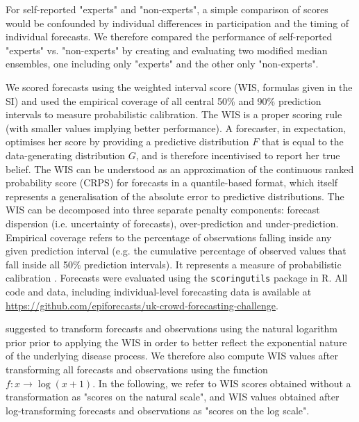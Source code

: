\documentclass[10pt,a4paper,twocolumn]{article}
\begin{document}
For self-reported "experts" and "non-experts", a simple comparison of scores would be confounded by individual differences in participation and the timing of individual forecasts. We therefore compared the performance of self-reported "experts" vs. "non-experts" by creating and evaluating two modified median ensembles, one including only "experts" and the other only "non-experts".


We scored forecasts using the weighted interval score (WIS, formulas given in the SI) %
\cite{bracherEvaluatingEpidemicForecasts2021} and used the empirical coverage of all central 50\% and 90\% prediction intervals to measure probabilistic calibration. The WIS is a proper scoring rule (with smaller values implying better performance). A forecaster, in expectation, optimises her score by providing a predictive distribution $F$ that is equal to the data-generating distribution $G$, and is therefore incentivised to report her true belief. The WIS can be understood as an approximation of the continuous ranked probability score (CRPS) for forecasts in a quantile-based format, which itself represents a generalisation of the absolute error to predictive distributions. The WIS can be decomposed into three separate penalty components: forecast dispersion (i.e. uncertainty of forecasts), over-prediction and under-prediction. Empirical coverage refers to the percentage of observations falling inside any given prediction interval (e.g. the cumulative percentage of observed values that fall inside all 50\% prediction intervals). It represents a measure of probabilistic calibration \citep{gneitingProbabilisticForecastsCalibration2007}. Forecasts were evaluated using the \texttt{scoringutils} \citep{bosseEvaluatingForecastsScoringutils2022} package in \textsf{R}. All code and data, including individual-level forecasting data is available at \url{https://github.com/epiforecasts/uk-crowd-forecasting-challenge}. 

\citet{bosseTransformationForecastsEvaluating2023} suggested to transform forecasts and observations using the natural logarithm prior prior to applying the WIS in order to better reflect the exponential nature of the underlying disease process. We therefore also compute WIS values after transforming all forecasts and observations using the function $f\colon x \to \log (x + 1)$. In the following, we refer to WIS scores obtained without a transformation as "scores on the natural scale", and WIS values obtained after log-transforming forecasts and observations as "scores on the log scale". 
\end{document}
